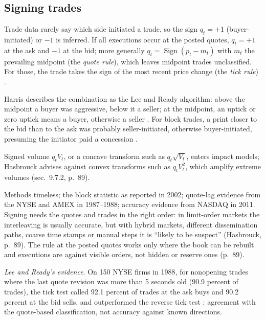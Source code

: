 \subsection{Signing trades}

\begin{qfmethod}\label{meth:trade-sign-classification}
 Trade data rarely say which side initiated a trade, so the sign $q_t=+1$ (buyer-initiated) or $-1$ is inferred. If all executions occur at the posted quotes, $q_t=+1$ at the ask and $-1$ at the bid; more generally $q_t=\operatorname{Sign}(p_t-m_t)$ with $m_t$ the prevailing midpoint (the \emph{quote rule}), which leaves midpoint trades unclassified. For those, the trade takes the sign of the most recent price change (the \emph{tick rule}) \citep[chap.~9, sec.~9.7.1, p.~89]{s6-hasbrouck}.

Harris describes the combination as the Lee and Ready algorithm: above the midpoint a buyer was aggressive, below it a seller; at the midpoint, an uptick or zero uptick means a buyer, otherwise a seller \citep[chap.~21, p.~423]{alpha-harris}. For block trades, a print closer to the bid than to the ask was probably seller-initiated, otherwise buyer-initiated, presuming the initiator paid a concession \citep[chap.~15, sec.~15.5, p.~332]{alpha-harris}.

Signed volume $q_tV_t$, or a concave transform such as $q_t\sqrt{V_t}$, enters impact models; Hasbrouck advises against convex transforms such as $q_tV_t^2$, which amplify extreme volumes (sec.~9.7.2, p.~89).

 Methods timeless; the block statistic as reported in 2002; quote-lag evidence from the NYSE and AMEX in 1987--1988; accuracy evidence from NASDAQ in 2011. Signing needs the quotes and trades in the right order: in limit-order markets the interleaving is usually accurate, but with hybrid markets, different dissemination paths, coarse time stamps or manual steps it is ``likely to be suspect'' (Hasbrouck, p.~89). The rule at the posted quotes works only where the book can be rebuilt and executions are against visible orders, not hidden or reserve ones (p.~89).

\emph{Lee and Ready's evidence}. On 150 NYSE firms in 1988, for nonopening trades where the last quote revision was more than 5 seconds old (90.9 percent of trades), the tick test called 92.1 percent of trades at the ask buys and 90.2 percent at the bid sells, and outperformed the reverse tick test \citep[sec.~I, Table~I, pp.~736--737]{lee-ready-1991}: agreement with the quote-based classification, not accuracy against known directions.


\end{qfmethod}

